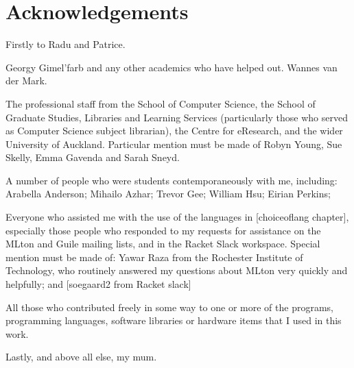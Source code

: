 \chapter*{Acknowledgements}


Firstly to Radu and Patrice.

Georgy Gimel'farb and any other academics who have helped out.  Wannes van der Mark.

The professional staff from the School of Computer Science, the School of Graduate Studies, Libraries and Learning Services (particularly those who served as Computer Science subject librarian), the Centre for eResearch, and the wider University of Auckland.  Particular mention must be made of Robyn Young, Sue Skelly, Emma Gavenda and Sarah Sneyd.


A number of people who were students contemporaneously with me, including: Arabella Anderson; Mihailo Azhar; Trevor Gee; William Hsu; Eirian Perkins;

Everyone who assisted me with the use of the languages in [choiceoflang chapter], especially those people who responded to my requests for assistance on the MLton and Guile mailing lists, and in the Racket Slack workspace.  Special mention must be made of: Yawar Raza from the Rochester Institute of Technology, who routinely answered my questions about MLton very quickly and helpfully; and [soegaard2 from Racket slack]

All those who contributed freely in some way to one or more of the programs, programming languages, software libraries or hardware items that I used in this work.

Lastly, and above all else, my mum.